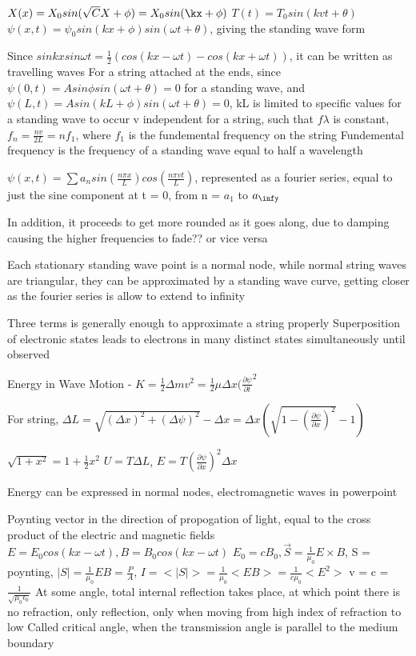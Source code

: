 \documentclass[11 pt, twoside]{article}
\begin{document}
$X(x) = X_0 sin(\sqrt{C}X + \phi) = X_0sin(\kx + \phi)$
$T(t) = T_0 sin(kvt +  \theta)$
$\psi(x, t) = \psi_0 sin(kx + \phi) sin(\omega t + \theta)$, giving the standing wave form

Since $sinkxsin\omega t = \frac{1}{2}(cos(kx - \omega t) - cos(kx + \omega t))$, it can be written as travelling waves
For a string attached at the ends, since $\psi(0, t) = Asin\phi sin(\omega t + \theta) = 0$ for a standing wave, and $\psi(L, t) = Asin(kL + \phi)sin(\omega t + \theta) = 0$, kL is limited to specific values for a standing wave to occur
v independent for a string, such that $f\lambda$ is constant, $f_n = \frac{nv}{2L} = nf_1$, where $f_1$ is the fundemental frequency on the string
Fundemental frequency is the frequency of a standing wave equal to half a wavelength

$\psi(x, t) = \sum a_n sin(\frac{n\pi x}{L})cos(\frac{n\pi vt}{L})$, represented as a fourier series, equal to just the sine component at t = 0, from n = $a_1$ to $a_\infy$

In addition, it proceeds to get more rounded as it goes along, due to damping causing the higher frequencies to fade?? or vice versa

Each stationary standing wave point is a normal node, while normal string waves are triangular, they can be approximated by a standing wave curve, getting closer as the fourier series is allow to extend to infinity

Three terms is generally enough to approximate a string properly
Superposition of electronic states leads to electrons in many distinct states simultaneously until observed

Energy in Wave Motion - $K = \frac{1}{2}\Delta mv^2  = \frac{1}{2} \mu \Delta x (\frac{\partial \psi}{\partial t}^2$

For string, $\Delta L = \sqrt{(\Delta x)^2 + (\Delta \psi)^2} - \Delta x = \Delta x (\sqrt{1 - (\frac{\partial \psi}{\partial x})^2} - 1)$

$\sqrt{1 + x^2} = 1 + \frac{1}{2}x^2$
$U = T\Delta L$, $E = T(\frac{\partial \psi}{\partial x})^2 \Delta x$

Energy can be expressed in normal nodes, electromagnetic waves in powerpoint

Poynting vector in the direction of propogation of light, equal to the cross product of the electric and magnetic fields
$E = E_0 cos(kx - \omega t), B = B_0 cos(kx - \omega t)$
$E_0 = cB_0, \vec{S} = \frac{1}{\mu_0}E\times B$, S = poynting, $|S| = \frac{1}{\mu_0}EB = \frac{P}{A}$, $I = <|S|> = \frac{1}{\mu_0}<EB> = \frac{1}{c\mu_0}<E^2>$
v = c = $\frac{1}{\sqrt{\mu_0 \epsilon_0}}$
At some angle, total internal reflection takes place, at which point there is no refraction, only reflection, only when moving from high index of refraction to low
Called critical angle, when the transmission angle is parallel to the medium boundary
\end{document}

